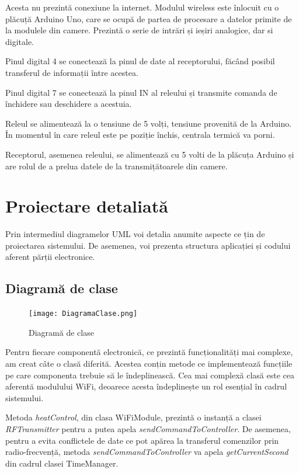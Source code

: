	Acesta nu prezintă conexiune la internet. Modulul wireless este înlocuit cu o plăcuță Arduino Uno, care se ocupă de partea de procesare a datelor primite de la modulele din camere. Prezintă o serie de intrări și ieșiri analogice, dar si digitale. 

	Pinul digital 4 se conectează la pinul de date al receptorului, făcând posibil transferul de informații între acestea.
	
	Pinul digital 7 se conectează la pinul IN al releului și transmite comanda de închidere sau deschidere a acestuia.

\vspace{1em}

	Releul se alimentează la o tensiune de 5 volți, tensiune provenită de la Arduino. În momentul în care releul este pe poziție închis, centrala termică va porni.

\vspace{1em}

	Receptorul, asemenea releului, se alimentează cu 5 volti de la plăcuța Arduino și are rolul de a prelua datele de la transmițătoarele din camere.

\section{Proiectare detaliată}

	Prin intermediul diagramelor UML voi detalia anumite aspecte ce țin de proiectarea sistemului. De asemenea, voi prezenta structura aplicației și codului aferent părții electronice.

\subsection{Diagramă de clase}

\begin{figure}[H]
   	\centering
    	\texttt{[image: DiagramaClase.png]}
	\caption{Diagramă de clase}
	\label{fig:DiagramaClase}
\end{figure}

	Pentru fiecare componentă electronică, ce prezintă funcționalități mai complexe, am creat câte o clasă diferită. Acestea conțin metode ce implementează funcțiile pe care componenta trebuie să le îndeplinească. Cea mai complexă clasă este cea aferentă modulului WiFi, deoarece acesta îndeplinește un rol esențial în cadrul sistemului.

	Metoda \textit{heatControl}, din clasa WiFiModule, prezintă o instanță a clasei \textit{RFTransmitter} pentru a putea apela \textit{sendCommandToController}. De asemenea, pentru a evita conflictele de date ce pot apărea la transferul comenzilor prin radio-frecvență, metoda \textit{sendCommandToController} va apela \textit{getCurrentSecond} din cadrul clasei TimeManager.
 	
